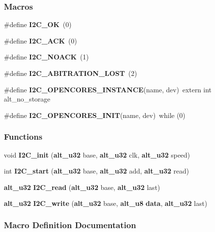 \subsubsection*{Macros}
\begin{DoxyCompactItemize}
\item 
\#define {\bf I2\+C\+\_\+\+OK}~(0)
\item 
\#define {\bf I2\+C\+\_\+\+A\+CK}~(0)
\item 
\#define {\bf I2\+C\+\_\+\+N\+O\+A\+CK}~(1)
\item 
\#define {\bf I2\+C\+\_\+\+A\+B\+I\+T\+R\+A\+T\+I\+O\+N\+\_\+\+L\+O\+ST}~(2)
\item 
\#define {\bf I2\+C\+\_\+\+O\+P\+E\+N\+C\+O\+R\+E\+S\+\_\+\+I\+N\+S\+T\+A\+N\+CE}(name,  dev)~extern int alt\+\_\+no\+\_\+storage
\item 
\#define {\bf I2\+C\+\_\+\+O\+P\+E\+N\+C\+O\+R\+E\+S\+\_\+\+I\+N\+IT}(name,  dev)~while (0)
\end{DoxyCompactItemize}
\subsubsection*{Functions}
\begin{DoxyCompactItemize}
\item 
void {\bf I2\+C\+\_\+init} ({\bf alt\+\_\+u32} base, {\bf alt\+\_\+u32} clk, {\bf alt\+\_\+u32} speed)
\item 
int {\bf I2\+C\+\_\+start} ({\bf alt\+\_\+u32} base, {\bf alt\+\_\+u32} add, {\bf alt\+\_\+u32} read)
\item 
{\bf alt\+\_\+u32} {\bf I2\+C\+\_\+read} ({\bf alt\+\_\+u32} base, {\bf alt\+\_\+u32} last)
\item 
{\bf alt\+\_\+u32} {\bf I2\+C\+\_\+write} ({\bf alt\+\_\+u32} base, {\bf alt\+\_\+u8} {\bf data}, {\bf alt\+\_\+u32} last)
\end{DoxyCompactItemize}


\subsubsection{Macro Definition Documentation}
